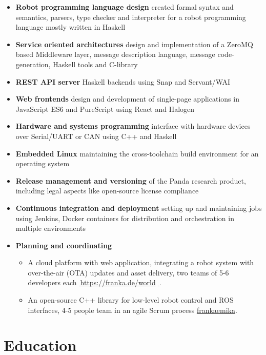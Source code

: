 \documentclass[11pt,a4paper,sans]{moderncv}
\renewcommand*{\link}[2][]{%
  \ifthenelse{\equal{#1}{}}%
    {\href{#2}{\color{link}\faExternalLink\,#2}}%
    {\href{#2}{\color{link}\faExternalLink\,#1}}}
\newcommand*{\githublink}[1]{\href{https://github.com/#1}{\color{link}\githubsocialsymbol#1}}%
\begin{document}
\begin{itemize}
\setlength\itemsep{0.5em}
\item \textbf{Robot programming language design} created formal syntax and semantics, parsers, type checker and interpreter for a robot programming language mostly written in Haskell
\item \textbf{Service oriented architectures} design and implementation of a ZeroMQ based Middleware layer, message description language, message code-generation, Haskell tools and C-library
\item \textbf{REST API server} Haskell backends using Snap and Servant/WAI
\item \textbf{Web frontends} design and development of single-page applications in JavaScript ES6 and PureScript using React and Halogen
\item \textbf{Hardware and systems programming} interface with hardware devices over Serial/UART or CAN using C++ and Haskell 
\item \textbf{Embedded Linux} maintaining the cross-toolchain build environment for an operating system
\item \textbf{Release management and versioning} of the Panda research product, including legal aspects like open-source license compliance
\item \textbf{Continuous integration and deployment} setting up and maintaining jobs using Jenkins, Docker containers for distribution and orchestration in multiple environments
\item \textbf{Planning and coordinating}
  \begin{itemize}
  \item A cloud platform with web application, integrating a robot system with
    over-the-air (OTA) updates and asset delivery, two teams of 5-6 developers
    each \link{https://franka.de/world}.
  \item An open-source C++ library for low-level robot control and ROS interfaces, 4-5 people team in an agile Scrum process \mbox{\githublink{frankaemika}}.
  \end{itemize}
\end{itemize}

\section{Education}
\end{document}
